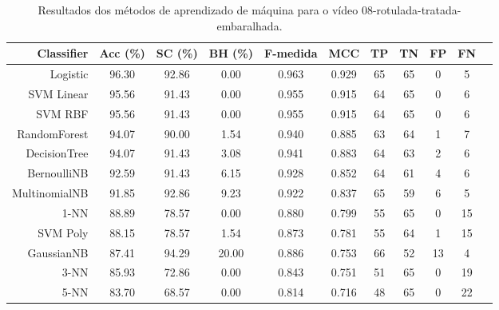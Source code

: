 \begin{table}[!htb]
\centering
\caption{Resultados dos métodos de aprendizado de máquina para o vídeo 08-rotulada-tratada-embaralhada.}
\label{tab:08-rotulada-tratada-embaralhada}
\begin{tabular}{r|c|c|c|c|c|c|c|c|c|c}
\hline\hline
Classifier & Acc (\%) & SC (\%) & BH (\%) & F-medida & MCC & TP & TN & FP & FN \\ \hline
Logistic & 96.30 & 92.86 & 0.00 & 0.963 & 0.929 & 65 & 65 & 0 & 5 \\ 
SVM Linear & 95.56 & 91.43 & 0.00 & 0.955 & 0.915 & 64 & 65 & 0 & 6 \\ 
SVM RBF & 95.56 & 91.43 & 0.00 & 0.955 & 0.915 & 64 & 65 & 0 & 6 \\ 
RandomForest & 94.07 & 90.00 & 1.54 & 0.940 & 0.885 & 63 & 64 & 1 & 7 \\ 
DecisionTree & 94.07 & 91.43 & 3.08 & 0.941 & 0.883 & 64 & 63 & 2 & 6 \\ 
BernoulliNB & 92.59 & 91.43 & 6.15 & 0.928 & 0.852 & 64 & 61 & 4 & 6 \\ 
MultinomialNB & 91.85 & 92.86 & 9.23 & 0.922 & 0.837 & 65 & 59 & 6 & 5 \\ 
1-NN & 88.89 & 78.57 & 0.00 & 0.880 & 0.799 & 55 & 65 & 0 & 15 \\ 
SVM Poly & 88.15 & 78.57 & 1.54 & 0.873 & 0.781 & 55 & 64 & 1 & 15 \\ 
GaussianNB & 87.41 & 94.29 & 20.00 & 0.886 & 0.753 & 66 & 52 & 13 & 4 \\ 
3-NN & 85.93 & 72.86 & 0.00 & 0.843 & 0.751 & 51 & 65 & 0 & 19 \\ 
5-NN & 83.70 & 68.57 & 0.00 & 0.814 & 0.716 & 48 & 65 & 0 & 22 \\ 
\hline\hline
\end{tabular}
\end{table}
